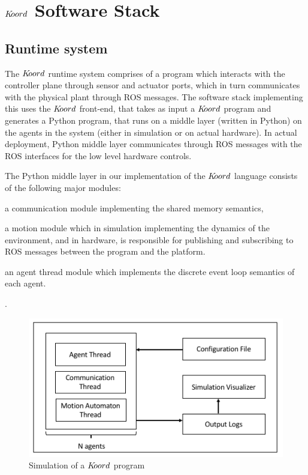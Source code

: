 \section{$K\kern-2pt oord$ Software Stack}
\label{sec:software}

\subsection{Runtime system}
 The $K\kern-2pt oord$ runtime system comprises of a program which interacts with the controller plane through sensor and actuator ports, which in turn communicates with the physical plant through ROS messages. The software stack implementing this uses the $K\kern-2pt oord$ front-end, that takes as input a $K\kern-2pt oord$ program and generates a Python program, that runs on a middle layer (written in Python) on the agents in the system (either in simulation or on actual hardware). In actual deployment, Python middle layer communicates through ROS messages with the ROS interfaces for the low level hardware controls. 


The Python middle layer in our implementation of the $K\kern-2pt oord$ language consists of the following major modules:\begin{inparaenum}
\item a communication module implementing the shared memory semantics,
\item a motion module which in simulation implementing the dynamics of the environment, and in hardware, is responsible for publishing and subscribing to ROS messages between the program and the platform. 
\item an agent thread module which implements the discrete event loop semantics of each agent. 
\end{inparaenum}. 

\begin{figure}
\includegraphics[scale=0.26]{figs/simulationengine.png}\hfill
\caption{\small Simulation of a $K\kern-2pt oord$ program }
\label{fig:completionstats}
\end{figure}

